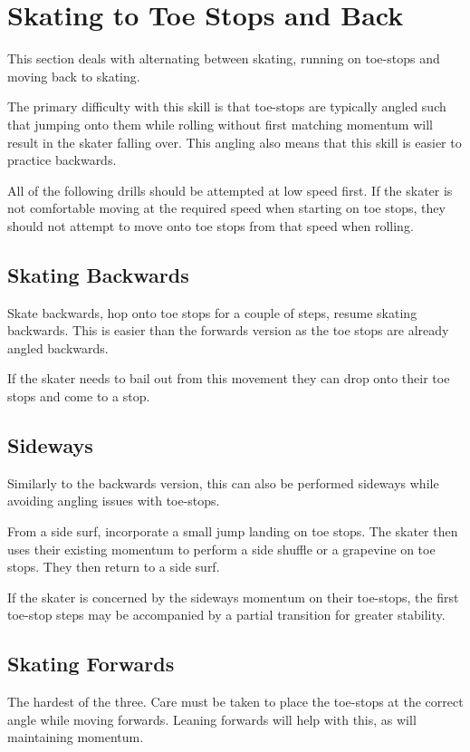 \section{Skating to Toe Stops and Back}
\label{sec:toe_stop/skating_to_toe}

This section deals with alternating between skating, running on toe-stops and moving back to skating.

The primary difficulty with this skill is that toe-stops are typically angled such that jumping onto them while rolling without first matching momentum will result in the skater falling over.    
This angling also means that this skill is easier to practice backwards.


All of the following drills should be attempted at low speed first. 
If the skater is not comfortable moving at the required speed when starting on toe stops, they should not attempt to move onto toe stops from that speed when rolling.  

\subsection{Skating Backwards}
Skate backwards, hop onto toe stops for a couple of steps, resume skating backwards.
This is easier than the forwards version as the toe stops are already angled backwards. 

If the skater needs to bail out from this movement they can drop onto their toe stops and come to a stop. 


\subsection{Sideways}
Similarly to the backwards version, this can also be performed sideways while avoiding angling issues with toe-stops.  

From a side surf, incorporate a small jump landing on toe stops.
The skater then uses their existing momentum to perform a side shuffle or a grapevine on toe stops.   
They then return to a side surf.

If the skater is concerned by the sideways momentum on their toe-stops, the first toe-stop steps may be accompanied by a partial transition for greater stability.  


\subsection{Skating Forwards}
The hardest of the three. 
Care must be taken to place the toe-stops at the correct angle while moving forwards. 
Leaning forwards will help with this, as will maintaining momentum. 
